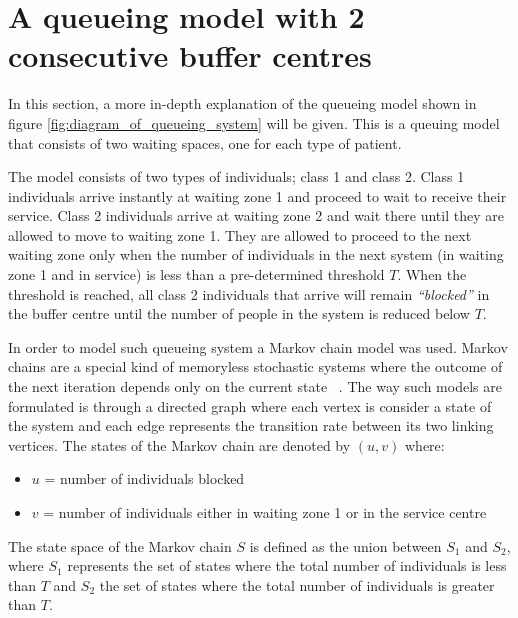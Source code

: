 \section{A queueing model with 2 consecutive buffer centres}

In this section, a more in-depth explanation of the queueing model shown in 
figure \ref{fig:diagram_of_queueing_system} will be given.
This is a queuing model that consists of two waiting spaces, one for each type
of patient.

The model consists of two types of individuals; class 1 and class 2.
Class 1 individuals arrive instantly at waiting zone 1 and proceed to wait to
receive their service. 
Class 2 individuals arrive at waiting zone 2 and wait there until they are 
allowed to move to waiting zone 1. 
They are allowed to proceed to the next waiting zone only when the number of 
individuals in the next system (in waiting zone 1 and in service) is less than a 
pre-determined threshold \(T\).
When the threshold is reached, all class 2 individuals that arrive will remain 
\textit{``blocked''} in the buffer centre until the number of people in the 
system is reduced below \(T\). 


In order to model such queueing system a Markov chain model was used.
Markov chains are a special kind of memoryless stochastic systems where the 
outcome of the next iteration depends only on the current state
~\cite{kemeny1976markov}. 
The way such models are formulated is through a directed graph where each vertex
is consider a state of the system and each edge represents the transition rate
between its two linking vertices.
The states of the Markov chain are denoted by \((u,v)\) where:

\begin{itemize}
    \item \(u\) = number of individuals blocked
    \item \(v\) = number of individuals either in waiting zone 1 or in the
    service centre
\end{itemize}


The state space of the Markov chain \(S\) is defined as the union between
\(S_1\) and \(S_2\), where \(S_1\) represents the set of states where the total 
number of individuals is less than \(T\) and \(S_2\) the set of states where the
total number of individuals is greater than \(T\). 

